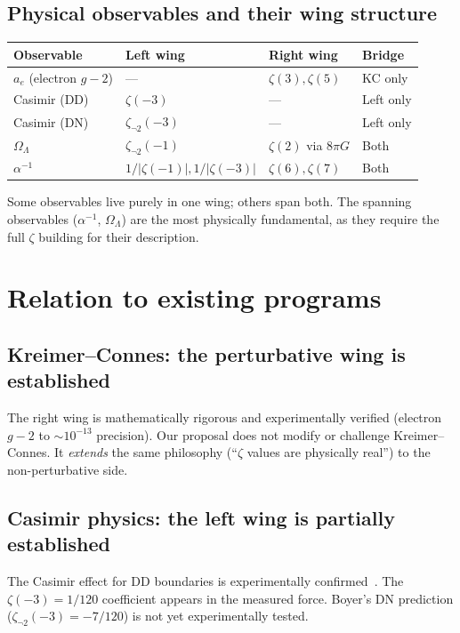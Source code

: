 \documentclass[11pt,a4paper]{article}
\begin{document}
\subsection{Physical observables and their wing structure}

\begin{center}
\begin{tabular}{llll}
\toprule
Observable & Left wing & Right wing & Bridge \\
\midrule
$a_e$ (electron $g-2$) & --- & $\zeta(3), \zeta(5)$ & KC only \\
Casimir (DD) & $\zeta(-3)$ & --- & Left only \\
Casimir (DN) & $\zeta_{\neg 2}(-3)$ & --- & Left only \\
$\Omega_\Lambda$ & $\zeta_{\neg 2}(-1)$ & $\zeta(2)$ via $8\pi G$ & Both \\
$\alpha^{-1}$ & $1/|\zeta(-1)|, 1/|\zeta(-3)|$ & $\zeta(6), \zeta(7)$ & Both \\
\bottomrule
\end{tabular}
\end{center}

Some observables live purely in one wing; others span both. The
spanning observables ($\alpha^{-1}$, $\Omega_\Lambda$) are the
most physically fundamental, as they require the full $\zeta$
building for their description.

\section{Relation to existing programs}

\subsection{Kreimer--Connes: the perturbative wing is established}

The right wing is mathematically rigorous and experimentally
verified (electron $g-2$ to $\sim 10^{-13}$ precision). Our
proposal does not modify or challenge Kreimer--Connes. It
\emph{extends} the same philosophy (``$\zeta$ values are
physically real'') to the non-perturbative side.

\subsection{Casimir physics: the left wing is partially established}

The Casimir effect for DD boundaries is experimentally
confirmed~\cite{Lamoreaux1997}. The $\zeta(-3) = 1/120$
coefficient appears in the measured force. Boyer's DN prediction
($\zeta_{\neg 2}(-3) = -7/120$) is not yet experimentally tested.
\end{document}
